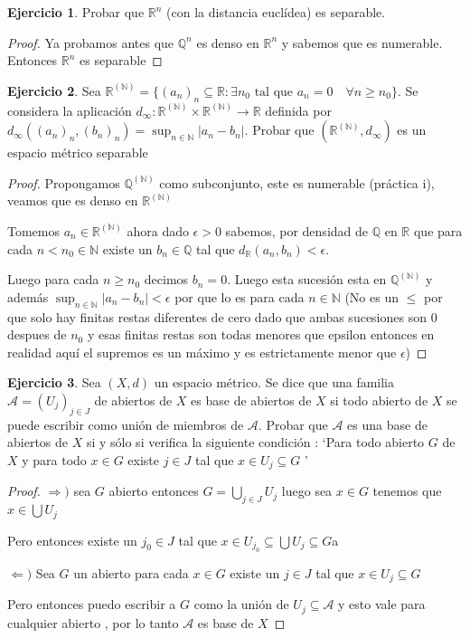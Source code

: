 \documentclass[12pt]{article}
\newcommand{\Q}{\mathbb{Q}}
\newcommand{\R}{\mathbb{R}}
\newcommand{\N}{\mathbb{N}}
\newcommand{\Ra}{\Rightarrow}
\newcommand{\ra}{\rightarrow}
\theoremstyle{definition}
\newtheorem{ej}{Ejercicio}
\begin{document}
\begin{ej}
  Probar que $\R^n$ (con la distancia euclídea) es separable.
  \begin{proof}
    Ya probamos antes que $\Q^n$ es denso en $\R^n$ y sabemos que es numerable. Entonces $\R^n$ es separable

  \end{proof}
\end{ej}
\begin{ej}
Sea $\R^{(\N)} = \{(a_n)_n \subseteq \R : \exists n_0 \text{ tal que } a_n = 0 \quad \forall n \geq n_0\}$. Se considera la aplicación $d_{\infty} : \R^{(\N)} \times \R^{(\N)} \ra \R$ definida por $d_{\infty}((a_n)_n,(b_n)_n) = \sup_{n \in \N}|a_n - b_n| $. Probar que $(\R^{(\N)},d_{\infty})$ es un espacio métrico separable

\begin{proof}
Propongamos $\Q^{(\N)}$ como subconjunto, este es numerable (práctica i), veamos que es denso en $\R^{(\N)}$

Tomemos $a_n \in \R^{(\N)}$ ahora dado $\epsilon >0$ sabemos, por densidad de $\Q$ en $\R$ que para cada $n < n_0 \in \N$ existe un $b_n \in \Q$ tal que $d_{\R}(a_n,b_n) < \epsilon$.

Luego para cada $n \geq n_0$ decimos $b_n = 0$. Luego esta sucesión esta en $\Q^{(\N)}$ y además $\sup_{n \in \N}|a_n - b_n| < \epsilon$ por que lo es para cada $n \in \N$ (No es un $\leq$ por que solo hay finitas restas diferentes de cero dado que ambas sucesiones son 0 despues de $n_0$ y esas finitas restas son todas menores que epsilon entonces en realidad aquí el supremos es un máximo y es estrictamente menor que $\epsilon$)
\end{proof}
\end{ej}
\begin{ej}
  Sea $(X,d)$ un espacio métrico. Se dice que una familia $\mathcal{A} = (U_j)_{j \in J}$ de abiertos de $X$ es base de abiertos de $X$ si todo abierto de $X$ se puede escribir como unión de miembros de $\mathcal{A}$. Probar que $\mathcal{A}$ es una base de abiertos de $X$ si y sólo si verifica la siguiente condición : `Para todo abierto $G$ de $X$ y para todo $x \in G$ existe $j \in J$ tal que $x \in U_j \subseteq G$ '
  \begin{proof}
  $\Ra )$ sea $G$ abierto entonces $G = \bigcup_{j \in J} U_j$ luego sea $x \in G$ tenemos que $x \in \bigcup U_j$

  Pero entonces existe un $j_0 \in J$ tal que $x \in U_{j_0} \subseteq \bigcup U_j \subseteq G$a

$\Leftarrow )$ Sea $G$ un abierto para cada $x \in G$ existe un $j \in J$ tal que $x \in U_j \subseteq G$

Pero entonces puedo escribir a $G$ como la unión de $U_j \subseteq \mathcal{A}$ y esto vale para cualquier abierto , por lo tanto $\mathcal{A}$ es base de $X$

  \end{proof}
\end{ej}
\end{document}

